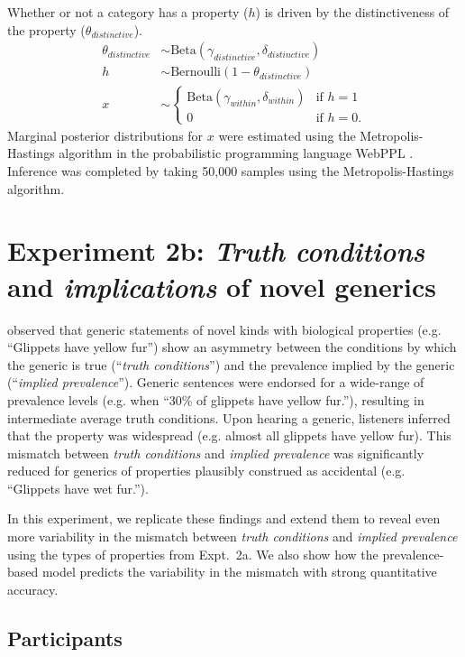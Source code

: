 \documentclass[10pt,letterpaper]{article}
\begin{document}
Whether or not a category has a property ($h$) is driven by the distinctiveness of the property ($\theta_{distinctive}$).
%
\begin{align*}
\theta_{distinctive} & \sim \text{Beta}(\gamma_{distinctive}, \delta_{distinctive}) \\ 
h & \sim \text{Bernoulli}(1 - \theta_{distinctive}) \\
x & \sim \begin{cases} 
		\text{Beta}(\gamma_{within}, \delta_{within}) &\mbox{if } h = 1 \\ 
				0 & \mbox{if } h=0. 
				\end{cases} 
\end{align*}
%
Marginal posterior distributions for $x$ were estimated using the Metropolis-Hastings algorithm in the probabilistic programming language WebPPL \cite{dippl}. Inference was completed by taking 50,000 samples using the Metropolis-Hastings algorithm.

\section{Experiment 2b: \emph{Truth conditions} and \emph{implications} of novel generics}

\citeauthor{Cimpian2010} observed that generic statements of novel kinds with biological properties (e.g. ``Glippets have yellow fur'') show an asymmetry between the conditions by which the generic is true (``\emph{truth conditions}'') and the prevalence implied by the generic (``\emph{implied prevalence}''). 
Generic sentences were endorsed for a wide-range of prevalence levels (e.g. when ``30\% of glippets have yellow fur.''), resulting in intermediate average truth conditions. 
Upon hearing a generic, listeners inferred that the property was widespread (e.g. almost all glippets have yellow fur).
This mismatch between \emph{truth conditions} and \emph{implied prevalence} was significantly reduced for generics of properties plausibly construed as accidental (e.g. ``Glippets have wet fur.'').

In this experiment,  we replicate these findings and extend them to reveal even more variability in the mismatch between \emph{truth conditions} and \emph{implied prevalence} using the types of properties from Expt.~2a.
We also show how the prevalence-based model predicts the variability in the mismatch with strong quantitative accuracy.


\subsection{Participants}
\end{document}
